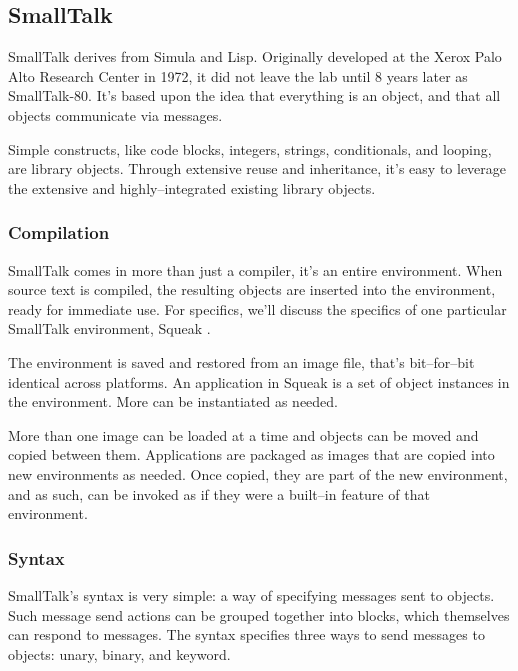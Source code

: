 \subsection{SmallTalk}
	SmallTalk derives from Simula and Lisp.  Originally developed at the Xerox Palo Alto Research Center in 1972, it did not leave the lab until 8 years later as SmallTalk-80. %
	It's based upon the idea that everything is an object, and that all objects communicate via messages.

	Simple constructs, like code blocks, integers, strings, conditionals, and looping, are library objects.  Through extensive reuse and inheritance, it's easy to leverage the extensive and highly--integrated existing library objects.  

\subsubsection{Compilation}
	SmallTalk comes in more than just a compiler, it's an entire environment.  When source text is compiled, the resulting objects are inserted into the environment, ready for immediate use.  For specifics, we'll discuss the specifics of one particular SmallTalk environment, Squeak \cite{squeak}.

	The environment is saved and restored from an image file, that's bit--for--bit identical across platforms.  An application in Squeak is a set of object instances in the environment.  More can be instantiated as needed.

	More than one image can be loaded at a time and objects can be moved and copied between them.%
Applications are packaged as images that are copied into new environments as needed.  Once copied, they are part of the new environment, and as such, can be invoked as if they were a built--in feature of that environment.

\subsubsection{Syntax}
	SmallTalk's syntax is very simple: a way of specifying messages sent to objects.  Such message send actions can be grouped together into blocks, which themselves can respond to messages.  The syntax specifies three ways to send messages to objects: unary, binary, and keyword.

